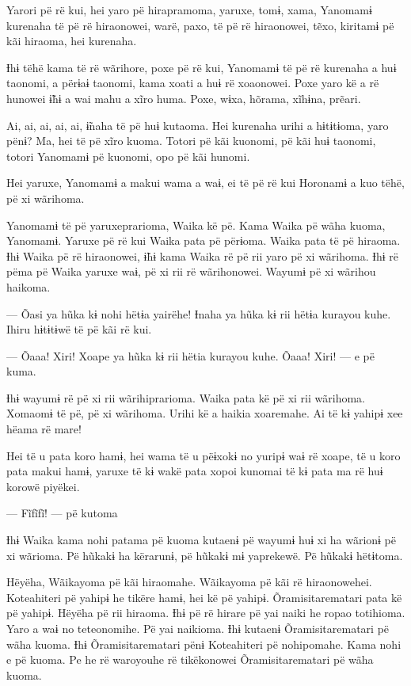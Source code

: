  

 

 


Yarori pë rë kui, hei yaro pë hirapramoma, yaruxe, tomɨ, xama, Yanomamɨ
kurenaha të pë rë hiraonowei, warë, paxo, të pë rë hiraonowei, tẽxo,
kiritamɨ pë kãi hiraoma, hei kurenaha. 

Ɨhɨ tëhë kama të rë wãrihore, poxe pë rë kui, Yanomamɨ të pë rë kurenaha
a huɨ taonomi, a përɨaɨ taonomi, kama xoati a huɨ rë xoaonowei. Poxe
yaro kë a rë hunowei ɨ̃hɨ a wai mahu a xĩro huma. Poxe, wɨxa, hõrama,
xĩhɨna, prẽari. 

Ai, ai, ai, ai, ai, ɨ̃naha të pë huɨ kutaoma. Hei kurenaha urihi a
hɨtɨtɨoma, yaro pënɨ? Ma, hei të pë xĩro kuoma. Totori pë kãi kuonomi,
pë kãi huɨ taonomi, totori Yanomamɨ pë kuonomi, opo pë kãi hunomi. 

Hei yaruxe, Yanomamɨ a makui wama a waɨ, ei të pë rë kui Horonamɨ a kuo
tëhë, pë xi wãrihoma. 

Yanomamɨ të pë yaruxeprarioma, Waika kë pë. Kama Waika pë wãha kuoma,
Yanomamɨ. Yaruxe pë rë kui Waika pata pë përɨoma. Waika pata të pë
hiraoma. Ɨhɨ Waika pë rë hiraonowei, ɨ̃hɨ kama Waika rë pë rii yaro pë xi
wãrihoma. Ɨhɨ rë pëma pë Waika yaruxe waɨ, pë xi rii rë wãrihonowei.
Wayumɨ pë xi wãrihou haikoma. 

--- Õasi ya hũka kɨ nohi hëtɨa yairëhe! Ɨnaha ya hũka kɨ rii hëtɨa
kurayou kuhe. Ihiru hɨtɨtɨwë të pë kãi rë kui. 

--- Õaaa! Xiri! Xoape ya hũka kɨ rii hëtia kurayou kuhe. Õaaa! Xiri! ---
e pë kuma. 

Ɨhɨ wayumɨ rë pë xi rii wãrihiprarioma. Waika pata kë pë xi rii
wãrihoma. Xomaomɨ të pë, pë xi wãrihoma. Urihi kë a haikia xoaremahe. Ai
të kɨ yahipɨ xee hëama rë mare! 

Hei të u pata koro hamɨ, hei wama të u pëɨxokɨ no yuripɨ waɨ rë xoape,
të u koro pata makui hamɨ, yaruxe të kɨ wakë pata xopoi kunomai të kɨ
pata ma rë huɨ korowë piyëkei. 

--- Fĩfĩfĩ! --- pë kutoma

Ɨhɨ Waika kama nohi patama pë kuoma kutaenɨ pë wayumɨ huɨ xi ha wãrionɨ
pë xi wãrioma. Pë hũkakɨ ha kërarunɨ, pë hũkakɨ mɨ yaprekewë. Pë hũkakɨ
hëtɨtoma.

 

Hëyëha, Wãikayoma pë kãi hiraomahe. Wãikayoma pë kãi rë hiraonowehei.
Koteahiteri pë yahipɨ he tikëre hamɨ, hei kë pë yahipɨ.
Õramisitarematari pata kë pë yahipɨ. Hëyëha pë rii hiraoma. Ɨhɨ pë rë
hirare pë yai naiki he ropao totihioma. Yaro a waɨ no teteonomihe. Pë
yai naikioma. Ɨhɨ kutaenɨ Õramisitarematari pë wãha kuoma. Ɨhɨ
Õramisitarematari pënɨ Koteahiteri pë nohipomahe. Kama nohi e pë kuoma.
Pe he rë waroyouhe rë tikëkonowei Õramisitarematari pë wãha kuoma. 

